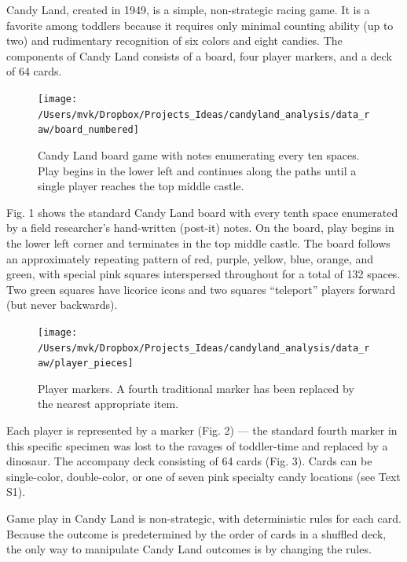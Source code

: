 \documentclass[letterpaper,9pt,twocolumn,twoside,]{pinp}
\begin{document}
Candy Land, created in 1949, is a simple, non-strategic racing game. It
is a favorite among toddlers because it requires only minimal counting
ability (up to two) and rudimentary recognition of six colors and eight
candies. The components of Candy Land consists of a board, four player
markers, and a deck of 64 cards.

\begin{figure}

{\centering \texttt{[image: /Users/mvk/Dropbox/Projects\_Ideas/candyland\_analysis/data\_raw/board\_numbered]} 

}

\caption{Candy Land board game with notes enumerating every ten spaces. Play begins in the lower left and continues along the paths until a single player reaches the top middle castle.}\label{fig:unnamed-chunk-3}
\end{figure}

Fig. 1 shows the standard Candy Land board with every tenth space
enumerated by a field researcher's hand-written (post-it) notes. On the
board, play begins in the lower left corner and terminates in the top
middle castle. The board follows an approximately repeating pattern of
red, purple, yellow, blue, orange, and green, with special pink squares
interspersed throughout for a total of 132 spaces. Two green squares
have licorice icons and two squares ``teleport'' players forward (but
never backwards).

\begin{figure}

{\centering \texttt{[image: /Users/mvk/Dropbox/Projects\_Ideas/candyland\_analysis/data\_raw/player\_pieces]} 

}

\caption{Player markers. A fourth traditional marker has been replaced by the nearest appropriate item.}\label{fig:unnamed-chunk-4}
\end{figure}

Each player is represented by a marker (Fig. 2) --- the standard fourth
marker in this specific specimen was lost to the ravages of toddler-time
and replaced by a dinosaur. The accompany deck consisting of 64 cards
(Fig. 3). Cards can be single-color, double-color, or one of seven pink
specialty candy locations (see Text S1).

Game play in Candy Land is non-strategic, with deterministic rules for
each card. Because the outcome is predetermined by the order of cards in
a shuffled deck, the only way to manipulate Candy Land outcomes is by
changing the rules.
\end{document}
